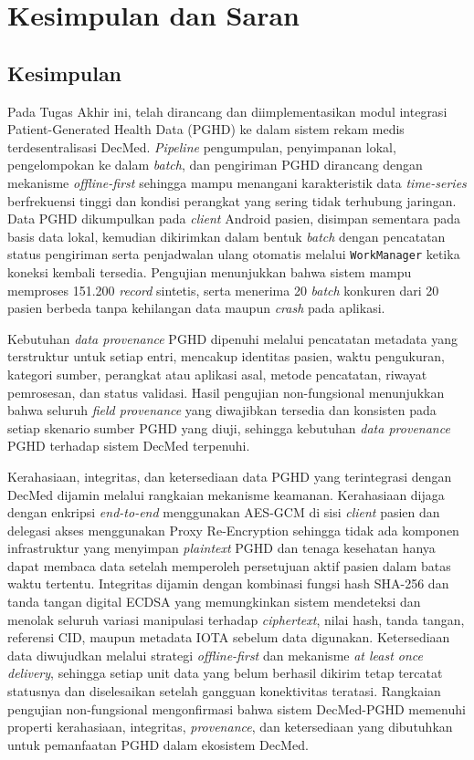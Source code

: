 \chapter{Kesimpulan dan Saran}

\section{Kesimpulan}

Pada Tugas Akhir ini, telah dirancang dan diimplementasikan modul integrasi Patient-Generated Health Data (PGHD) ke dalam sistem rekam medis terdesentralisasi DecMed. 
\textit{Pipeline} pengumpulan, penyimpanan lokal, pengelompokan ke dalam \textit{batch}, dan pengiriman PGHD dirancang dengan mekanisme \textit{offline-first} sehingga mampu menangani karakteristik data \textit{time-series} berfrekuensi tinggi dan kondisi perangkat yang sering tidak terhubung jaringan. 
Data PGHD dikumpulkan pada \textit{client} Android pasien, disimpan sementara pada basis data lokal, kemudian dikirimkan dalam bentuk \textit{batch} dengan pencatatan status pengiriman serta penjadwalan ulang otomatis melalui \texttt{WorkManager} ketika koneksi kembali tersedia.
Pengujian menunjukkan bahwa sistem mampu memproses 151.200 \textit{record} sintetis, serta menerima 20 \textit{batch} konkuren dari 20 pasien berbeda tanpa kehilangan data maupun \textit{crash} pada aplikasi. 

Kebutuhan \textit{data provenance} PGHD dipenuhi melalui pencatatan metadata yang terstruktur untuk setiap entri, mencakup identitas pasien, waktu pengukuran, kategori sumber, perangkat atau aplikasi asal, metode pencatatan, riwayat pemrosesan, dan status validasi. 
Hasil pengujian non-fungsional menunjukkan bahwa seluruh \textit{field provenance} yang diwajibkan tersedia dan konsisten pada setiap skenario sumber PGHD yang diuji, sehingga kebutuhan \textit{data provenance} PGHD terhadap sistem DecMed terpenuhi. 

Kerahasiaan, integritas, dan ketersediaan data PGHD yang terintegrasi dengan DecMed dijamin melalui rangkaian mekanisme keamanan. 
Kerahasiaan dijaga dengan enkripsi \textit{end-to-end} menggunakan AES-GCM di sisi \textit{client} pasien dan delegasi akses menggunakan Proxy Re-Encryption sehingga tidak ada komponen infrastruktur yang menyimpan \textit{plaintext} PGHD dan tenaga kesehatan hanya dapat membaca data setelah memperoleh persetujuan aktif pasien dalam batas waktu tertentu. 
Integritas dijamin dengan kombinasi fungsi hash SHA-256 dan tanda tangan digital ECDSA yang memungkinkan sistem mendeteksi dan menolak seluruh variasi manipulasi terhadap \textit{ciphertext}, nilai hash, tanda tangan, referensi CID, maupun metadata IOTA sebelum data digunakan. 
Ketersediaan data diwujudkan melalui strategi \textit{offline-first} dan mekanisme \textit{at least once delivery}, sehingga setiap unit data yang belum berhasil dikirim tetap tercatat statusnya dan diselesaikan setelah gangguan konektivitas teratasi. 
Rangkaian pengujian non-fungsional mengonfirmasi bahwa sistem DecMed-PGHD memenuhi properti kerahasiaan, integritas, \textit{provenance}, dan ketersediaan yang dibutuhkan untuk pemanfaatan PGHD dalam ekosistem DecMed. 

